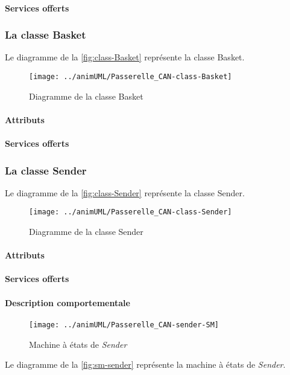 \paragraph{Services offerts}
\classNetworkOperations
\subsubsection{La classe Basket}

Le diagramme de la \autoref{fig:class-Basket} représente la classe Basket.
\begin{figure}[H]
	\centering
	\texttt{[image: ../animUML/Passerelle\_CAN-class-Basket]}
	\caption{Diagramme de la classe Basket}
	\label{fig:class-Basket}
\end{figure}


\paragraph{Attributs}
\classBasketProperties
\paragraph{Services offerts}
\classBasketOperations
\subsubsection{La classe Sender}

Le diagramme de la \autoref{fig:class-Sender} représente la classe Sender.
\begin{figure}[H]
	\centering
	\texttt{[image: ../animUML/Passerelle\_CAN-class-Sender]}
	\caption{Diagramme de la classe Sender}
	\label{fig:class-Sender}
\end{figure}


\paragraph{Attributs}
\classSenderProperties
\paragraph{Services offerts}
\classSenderOperations
\paragraph{Description comportementale}
\begin{figure}[H]
	\centering
	\texttt{[image: ../animUML/Passerelle\_CAN-sender-SM]}
	\caption{Machine à états de \emph{Sender}}
	\label{fig:sm-sender}
\end{figure}
Le diagramme de la \autoref{fig:sm-sender} représente la machine à états de \emph{Sender}.

